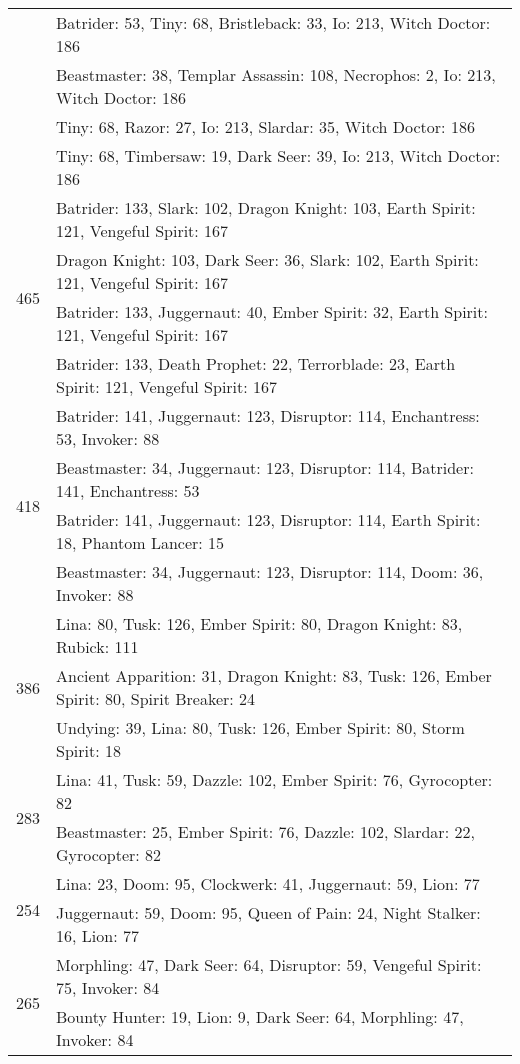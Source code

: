 \documentclass[result.tex]{subfiles}
\begin{document}
\begin{table}[H]
\begin{tabular}{ | c | p{12.5cm} | }
& Batrider: 53, Tiny: 68, Bristleback: 33, Io: 213, Witch Doctor: 186 \\
& Beastmaster: 38, Templar Assassin: 108, Necrophos: 2, Io: 213, Witch Doctor: 186 \\
& Tiny: 68, Razor: 27, Io: 213, Slardar: 35, Witch Doctor: 186 \\
& Tiny: 68, Timbersaw: 19, Dark Seer: 39, Io: 213, Witch Doctor: 186 \\
\hline
\multirow{4}{*}{465}
& Batrider: 133, Slark: 102, Dragon Knight: 103, Earth Spirit: 121, Vengeful Spirit: 167 \\
& Dragon Knight: 103, Dark Seer: 36, Slark: 102, Earth Spirit: 121, Vengeful Spirit: 167 \\
& Batrider: 133, Juggernaut: 40, Ember Spirit: 32, Earth Spirit: 121, Vengeful Spirit: 167 \\
& Batrider: 133, Death Prophet: 22, Terrorblade: 23, Earth Spirit: 121, Vengeful Spirit: 167 \\
\hline
\multirow{4}{*}{418}
& Batrider: 141, Juggernaut: 123, Disruptor: 114, Enchantress: 53, Invoker: 88 \\
& Beastmaster: 34, Juggernaut: 123, Disruptor: 114, Batrider: 141, Enchantress: 53 \\
& Batrider: 141, Juggernaut: 123, Disruptor: 114, Earth Spirit: 18, Phantom Lancer: 15 \\
& Beastmaster: 34, Juggernaut: 123, Disruptor: 114, Doom: 36, Invoker: 88 \\
\hline
\multirow{3}{*}{386}
& Lina: 80, Tusk: 126, Ember Spirit: 80, Dragon Knight: 83, Rubick: 111 \\
& Ancient Apparition: 31, Dragon Knight: 83, Tusk: 126, Ember Spirit: 80, Spirit Breaker: 24 \\
& Undying: 39, Lina: 80, Tusk: 126, Ember Spirit: 80, Storm Spirit: 18 \\
\hline
\multirow{2}{*}{283}
& Lina: 41, Tusk: 59, Dazzle: 102, Ember Spirit: 76, Gyrocopter: 82 \\
& Beastmaster: 25, Ember Spirit: 76, Dazzle: 102, Slardar: 22, Gyrocopter: 82 \\
\hline
\multirow{2}{*}{254}
& Lina: 23, Doom: 95, Clockwerk: 41, Juggernaut: 59, Lion: 77 \\
& Juggernaut: 59, Doom: 95, Queen of Pain: 24, Night Stalker: 16, Lion: 77 \\
\hline
\multirow{2}{*}{265}
& Morphling: 47, Dark Seer: 64, Disruptor: 59, Vengeful Spirit: 75, Invoker: 84 \\
& Bounty Hunter: 19, Lion: 9, Dark Seer: 64, Morphling: 47, Invoker: 84 \\

\end{tabular}
\end{table}
\end{document}
